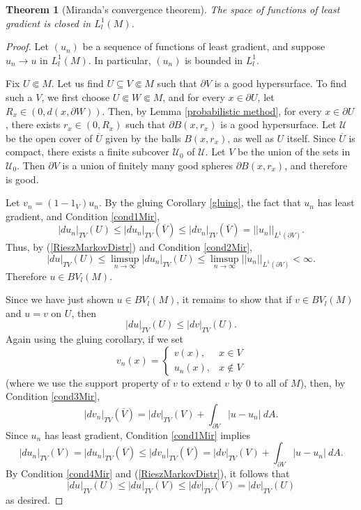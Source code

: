 \documentclass[reqno,12pt,letterpaper]{amsart}
\newtheorem{theorem}{Theorem}[section]
\theoremstyle{definition}
\numberwithin{equation}{section}
\begin{document}
\begin{theorem}[Miranda's convergence theorem]\label{Miranda convergence}
The space of functions of least gradient is closed in $L^1_l(M)$.
\end{theorem}
\begin{proof}
Let $(u_n)$ be a sequence of functions of least gradient, and suppose $u_n \to u$ in $L^1_l(M)$.
In particular, $(u_n)$ is bounded in $L^1_l$.

Fix $U \Subset M$. Let us find $U \subseteq V \Subset M$ such that $\partial V$ is a good hypersurface.
To find such a $V$, we first choose $U \Subset W \Subset M$, and for every $x \in \partial U$, let $R_x \in (0, d(x, \partial W))$.
Then, by Lemma \ref{probabilistic method}, for every $x \in \partial U$, there exists $r_x \in (0, R_x)$ such that $\partial B(x, r_x)$ is a good hypersurface.
Let $\mathcal U$ be the open cover of $\overline U$ given by the balls $B(x, r_x)$, as well as $U$ itself.
Since $\overline U$ is compact, there exists a finite subcover $\mathcal U_0$ of $\mathcal U$.
Let $V$ be the union of the sets in $\mathcal U_0$.
Then $\partial V$ is a union of finitely many good spheres $\partial B(x, r_x)$, and therefore is good.

Let $v_n = (1 - 1_V)u_n$.
By the gluing Corollary \ref{gluing}, the fact that $u_n$ has least gradient, and Condition \ref{cond1Mir},
$$|du_n|_{TV}(U) \leq |du_n|_{TV}(\overline V) \leq |dv_n|_{TV}(\overline V) = ||u_n||_{L^1(\partial V)}.$$
Thus, by (\ref{RieszMarkovDistr}) and Condition \ref{cond2Mir},
$$|du|_{TV}(U) \leq \limsup_{n \to \infty} |du_n|_{TV}(U) \leq \limsup_{n \to \infty} ||u_n||_{L^1(\partial V)} < \infty.$$
Therefore $u \in BV_l(M)$.

Since we have just shown $u \in BV_l(M)$, it remains to show that if $v \in BV_l(M)$ and $u = v$ on $U$, then
$$|du|_{TV}(U) \leq |dv|_{TV}(U).$$
Again using the gluing corollary, if we set
$$v_n(x) = \begin{cases}
v(x), &x \in V\\
u_n(x), &x \notin V
\end{cases}$$
(where we use the support property of $v$ to extend $v$ by $0$ to all of $M$), then, by Condition \ref{cond3Mir},
$$|dv_n|_{TV}(\overline V) = |dv|_{TV}(V) + \int_{\partial V} |u - u_n| ~dA.$$
Since $u_n$ has least gradient, Condition \ref{cond1Mir} implies
$$|du_n|_{TV}(V) = |du_n|_{TV}(\overline V) \leq |dv_n|_{TV}(\overline V) = |dv|_{TV}(V) + \int_{\partial V} |u - u_n| ~dA.$$
By Condition \ref{cond4Mir} and (\ref{RieszMarkovDistr}), it follows that
$$|du|_{TV}(U) \leq |du|_{TV}(V) \leq |dv|_{TV}(V) = |dv|_{TV}(U)$$
as desired.
\end{proof}
\end{document}
